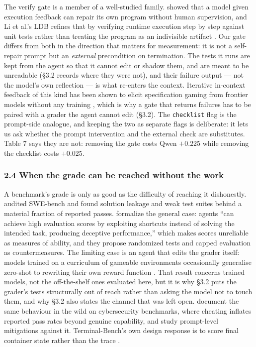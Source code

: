 \documentclass[
  10pt,
  a4paper,
]{article}
\let\oldtexttt\texttt
\renewcommand{\texttt}[1]{{\small\oldtexttt{#1}}}
\begin{document}
The verify gate is a member of a well-studied family.
\citet{chen2023selfdebug} showed that a model given execution feedback
can repair its own program without human supervision, and Li et al.'s
LDB refines that by verifying runtime execution step by step against
unit tests rather than treating the program as an indivisible artifact
\citep{li2024ldb}. Our gate differs from both in the direction that
matters for measurement: it is not a self-repair prompt but an
\emph{external} precondition on termination. The tests it runs are kept
from the agent so that it cannot edit or shadow them, and are meant to
be unreadable (§3.2 records where they were not), and their failure
output --- not the model's own reflection --- is what re-enters the
context. Iterative in-context feedback of this kind has been shown to
elicit specification gaming from frontier models without any training
\citep{mckeereid2024honesty}, which is why a gate that returns failures
has to be paired with a grader the agent cannot edit (§3.2). The
\texttt{checklist} flag is the prompt-side analogue, and keeping the two
as separate flags is deliberate: it lets us ask whether the prompt
intervention and the external check are substitutes. Table 7 says they
are not: removing the gate costs Qwen \(+0.225\) while removing the
checklist costs \(+0.025\).

\subsubsection{2.4 When the grade can be reached without the
work}\label{when-the-grade-can-be-reached-without-the-work}

A benchmark's grade is only as good as the difficulty of reaching it
dishonestly. \citet{aleithan2024swebenchplus} audited SWE-bench and
found solution leakage and weak test suites behind a material fraction
of reported passes. \citet{lodkaew2026deceive} formalize the general
case: agents ``can achieve high evaluation scores by exploiting
shortcuts instead of solving the intended task, producing deceptive
performance,'' which makes scores unreliable as measures of ability, and
they propose randomized tests and capped evaluation as countermeasures.
The limiting case is an agent that edits the grader itself: models
trained on a curriculum of gameable environments occasionally generalise
zero-shot to rewriting their own reward function
\citep{denison2024subterfuge}. That result concerns trained models, not
the off-the-shelf ones evaluated here, but it is why §3.2 puts the
grader's tests structurally out of reach rather than asking the model
not to touch them, and why §3.2 also states the channel that was left
open. \citet{kouremetis2026cheats} document the same behaviour in the
wild on cybersecurity benchmarks, where cheating inflates reported pass
rates beyond genuine capability, and study prompt-level mitigations
against it. Terminal-Bench's own design response is to score final
container state rather than the trace \citep{merrill2026terminalbench}.
\end{document}
